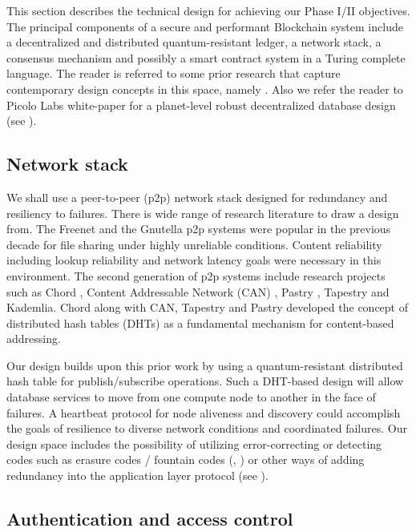 \label{sec:design} This section describes the technical design for achieving our Phase I/II objectives. The principal
components of a secure and performant Blockchain system include a decentralized and distributed quantum-resistant ledger, a network stack,
a consensus mechanism and possibly a smart contract system in a Turing complete language. The reader is referred to some
prior research that capture contemporary design concepts in this space, namely \cite{micali16, garay2015, ava2018}. Also
we refer the reader to Picolo Labs white-paper for a planet-level robust decentralized database design (see
\cite{picolo2018}).

\subsection{Network stack}

We shall use a peer-to-peer (p2p) network stack designed for redundancy and resiliency to failures. There is wide range of research
literature to draw a design from.  The Freenet \cite{freenet_thesis, Clarke_2001} and the Gnutella \cite{Gnutella} p2p
systems were popular in the previous decade for file sharing under highly unreliable conditions.
Content reliability including lookup reliability and network latency goals were necessary in
this environment. The second generation of p2p systems include research projects such as Chord \cite{Stoica_2001},
Content Addressable Network (CAN) \cite{Ratnasamy_2001}, Pastry \cite{Rowstron_2001}, Tapestry \cite{tapestry2004} and
Kademlia. Chord along with CAN, Tapestry and Pastry developed the concept of distributed hash tables (DHTs) as a
fundamental mechanism for content-based addressing.

Our design builds upon this prior work by using a quantum-resistant distributed hash table for
publish/subscribe operations. Such a DHT-based design will allow database services to move from one compute node to another in the face of
failures. A heartbeat protocol for node aliveness and discovery could accomplish the goals of resilience to diverse
network conditions and coordinated failures. Our design space includes the possibility of utilizing error-correcting or
detecting codes such as erasure codes / fountain codes (\cite{byers1998}, \cite{hu2013}) or other ways of adding
redundancy into the application layer protocol (see \cite{bloxroute}).

\subsection{Authentication and access control}

